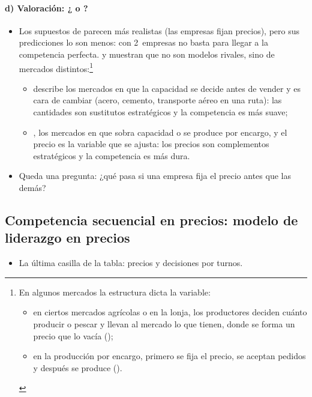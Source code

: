 \documentclass[11pt]{article}
\begin{document}
\paragraph{d) Valoración: ¿ o ?}

\begin{itemize}
\item Los supuestos de  parecen más realistas (las empresas fijan precios), pero sus predicciones lo son menos: con 2~empresas no basta para llegar a la competencia perfecta.  y  muestran que no son modelos rivales, sino de mercados distintos:\footnote{En algunos mercados la estructura dicta la variable:
\begin{itemize}
\item en ciertos mercados agrícolas o en la lonja, los productores deciden cuánto producir o pescar y llevan al mercado lo que tienen, donde se forma un precio que lo vacía ();
\item en la producción por encargo, primero se fija el precio, se aceptan pedidos y después se produce ().
\end{itemize}}
  \begin{itemize}
  \item {} describe los mercados en que la capacidad se decide antes de vender y es cara de cambiar (acero, cemento, transporte aéreo en una ruta): las cantidades son sustitutos estratégicos y la competencia es más suave;
  \item {}, los mercados en que sobra capacidad o se produce por encargo, y el precio es la variable que se ajusta: los precios son complementos estratégicos y la competencia es más dura.
  \end{itemize}
\item Queda una pregunta: ¿qué pasa si una empresa fija el precio antes que las demás?
\end{itemize}

\subsection{Competencia secuencial en precios: modelo de liderazgo en precios}\label{sec:liderazgo-precios}

\begin{itemize}
\item La última casilla de la tabla: precios y decisiones por turnos.
\end{itemize}
\end{document}
